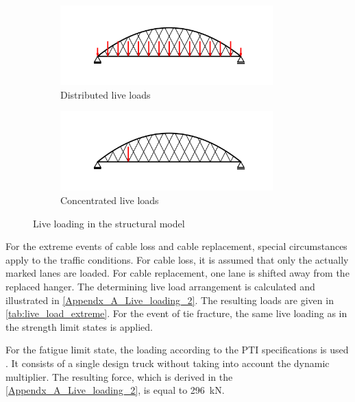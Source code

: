 \begin{figure}[H]
\centering
\begin{subfigure}{0.5\textwidth}
    \centering
    \includegraphics[trim={0 0.8cm 0 0.8cm},clip, width=0.9\textwidth]{illustrations/figures/distributed live loads.png}
    \caption{Distributed live loads}
    \label{fig:Live_load_1}
\end{subfigure}%
\begin{subfigure}{.5\textwidth}
    \centering
    \includegraphics[trim={0 0.8cm 0 0.8cm},clip, width=0.9\textwidth]{illustrations/figures/concentrated live loads.png}
    \caption{Concentrated live loads}
    \label{fig:Live_load_2}
\end{subfigure}
\caption{Live loading in the structural model}
\label{fig:Live_load}
\end{figure}

For the extreme events of cable loss and cable replacement, special circumstances apply to the traffic conditions. For cable loss, it is assumed that only the actually marked lanes are loaded. For cable replacement, one lane is shifted away from the replaced hanger. The determining live load arrangement is calculated and illustrated in \cref{Appendx_A_Live_loading_2}. The resulting loads are given in \cref{tab:live_load_extreme}. For the event of tie fracture, the same live loading as in the strength limit states is applied.



For the fatigue limit state, the loading according to the PTI specifications is used \cite{PTI}. It consists of a single design truck without taking into account the dynamic multiplier. The resulting force, which is derived in the \cref{Appendx_A_Live_loading_2}, is equal to \SI{296}{kN}.


